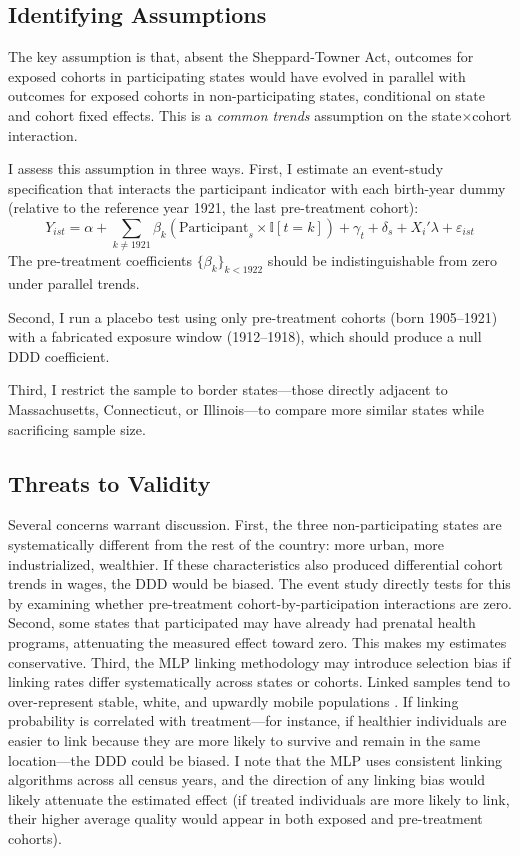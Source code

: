 \documentclass[12pt]{article}
\newcommand{\ind}{\mathbb{I}}
\begin{document}
\subsection{Identifying Assumptions}

The key assumption is that, absent the Sheppard-Towner Act, outcomes for exposed cohorts in participating states would have evolved in parallel with outcomes for exposed cohorts in non-participating states, conditional on state and cohort fixed effects. This is a \textit{common trends} assumption on the state$\times$cohort interaction.

I assess this assumption in three ways. First, I estimate an event-study specification that interacts the participant indicator with each birth-year dummy (relative to the reference year 1921, the last pre-treatment cohort):
\begin{equation}
Y_{ist} = \alpha + \sum_{k \neq 1921} \beta_k (\text{Participant}_s \times \ind[t = k]) + \gamma_t + \delta_s + X_i'\lambda + \varepsilon_{ist} \label{eq:eventstudy}
\end{equation}
The pre-treatment coefficients $\{\beta_k\}_{k < 1922}$ should be indistinguishable from zero under parallel trends.

Second, I run a placebo test using only pre-treatment cohorts (born 1905--1921) with a fabricated exposure window (1912--1918), which should produce a null DDD coefficient.

Third, I restrict the sample to border states---those directly adjacent to Massachusetts, Connecticut, or Illinois---to compare more similar states while sacrificing sample size.

\subsection{Threats to Validity}

Several concerns warrant discussion. First, the three non-participating states are systematically different from the rest of the country: more urban, more industrialized, wealthier. If these characteristics also produced differential cohort trends in wages, the DDD would be biased. The event study directly tests for this by examining whether pre-treatment cohort-by-participation interactions are zero. Second, some states that participated may have already had prenatal health programs, attenuating the measured effect toward zero. This makes my estimates conservative. Third, the MLP linking methodology may introduce selection bias if linking rates differ systematically across states or cohorts. Linked samples tend to over-represent stable, white, and upwardly mobile populations \citep{abramitzkyboustan2017}. If linking probability is correlated with treatment---for instance, if healthier individuals are easier to link because they are more likely to survive and remain in the same location---the DDD could be biased. I note that the MLP uses consistent linking algorithms across all census years, and the direction of any linking bias would likely attenuate the estimated effect (if treated individuals are more likely to link, their higher average quality would appear in both exposed and pre-treatment cohorts).
\end{document}
